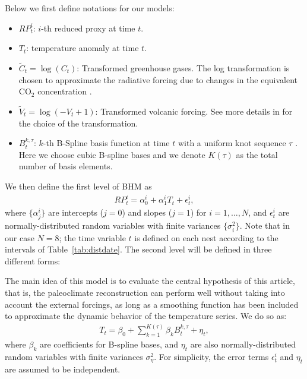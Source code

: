 \documentclass[12pt]{amsart}
\theoremstyle{plain}
\theoremstyle{definition}
\theoremstyle{remark}
\begin{document}
Below we first define notations for our models:
\begin{itemize}
\item $RP_t^i$: $i$-th reduced proxy at time $t$.
  
\item $T_t$: temperature anomaly at time $t$.
  
\item $\tilde C_t = \log (C_t)$: Transformed greenhouse gases. The log
  transformation is chosen to approximate the radiative forcing due to changes
  in the equivalent CO$_2$ concentration \citep{Barboza2014}.
  
\item $\tilde V_t = \log (-V_t+1)$: Transformed volcanic forcing. See more details in \cite{Barboza2014} for the choice of the transformation.
  
\item $B_t^{k,\tau}$: $k$-th B-Spline basis function at time $t$ with a uniform knot
  sequence $\tau$ \citep{DeBoor2001,Ramsay2005}. Here we choose
  cubic B-spline bases and we denote $K(\tau)$ as the total number of basis elements.  
\end{itemize}
We then define the first level of BHM as
\begin{align*}
RP_t^i=\alpha_0^i+\alpha_1^iT_t+\epsilon^i_t,  
\end{align*}
where $\{\alpha^i_j\}$ are intercepts ($j=0$) and slopes ($j=1$) for $i=1,\ldots,N$,  and $\epsilon^i_t$ are normally-distributed random variables with finite variances
$\{\sigma^2_i\}$. Note that in our case $N=8$; the time variable $t$ is defined on each nest according to the
intervals of Table~\ref{tab:distdate}. 
The second level will be defined in three different forms:

The main idea of this model is to evaluate the
central hypothesis of this article, that is, the paleoclimate reconstruction can
perform  well without taking into account the external forcings, as long as a
smoothing function has been included to approximate the dynamic behavior of the temperature series. We do so as: 
  \begin{align}\label{eq:M1}
    T_t=\beta_0+\sum_{k=1}^{K(\tau)}\beta_k B_t^{k,\tau}+\eta_t,
  \end{align}
where $\beta_k$ are coefficients for B-spline bases, and
$\eta_t$ are also normally-distributed random variables with finite variances
$\sigma^2_{\eta}$. For simplicity, the error terms $\epsilon^i_t$ and $\eta_t$
are assumed to be independent.  
\end{document}

